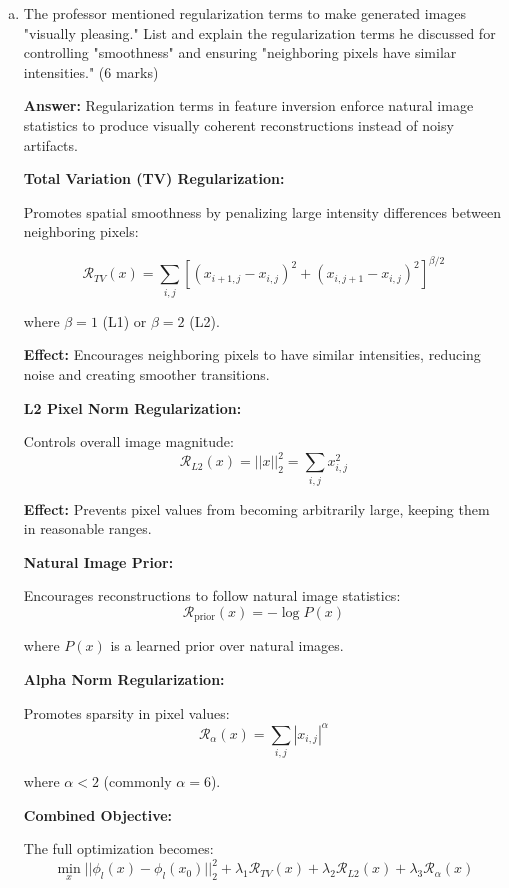 \documentclass[12pt]{article}
\newcommand{\answer}[1]{{\color{answercolor}\textbf{Answer:} #1}}
\newcommand{\explanation}[1]{{\color{explanationcolor}#1}}
\begin{document}
\begin{enumerate}[(a)]
    \item The professor mentioned regularization terms to make generated images "visually pleasing." List and explain the regularization terms he discussed for controlling "smoothness" and ensuring "neighboring pixels have similar intensities." \hfill (6 marks)
    
    \answer{Regularization terms in feature inversion enforce natural image statistics to produce visually coherent reconstructions instead of noisy artifacts.}
    
    \explanation{
    \textbf{Total Variation (TV) Regularization:}
    
    Promotes spatial smoothness by penalizing large intensity differences between neighboring pixels:
    
    $$\mathcal{R}_{TV}(x) = \sum_{i,j} \left[ (x_{i+1,j} - x_{i,j})^2 + (x_{i,j+1} - x_{i,j})^2 \right]^{\beta/2}$$
    
    where $\beta = 1$ (L1) or $\beta = 2$ (L2).
    
    \textbf{Effect:} Encourages neighboring pixels to have similar intensities, reducing noise and creating smoother transitions.
    
    \textbf{L2 Pixel Norm Regularization:}
    
    Controls overall image magnitude:
    $$\mathcal{R}_{L2}(x) = ||x||_2^2 = \sum_{i,j} x_{i,j}^2$$
    
    \textbf{Effect:} Prevents pixel values from becoming arbitrarily large, keeping them in reasonable ranges.
    
    \textbf{Natural Image Prior:}
    
    Encourages reconstructions to follow natural image statistics:
    $$\mathcal{R}_{\text{prior}}(x) = -\log P(x)$$
    
    where $P(x)$ is a learned prior over natural images.
    
    \textbf{Alpha Norm Regularization:}
    
    Promotes sparsity in pixel values:
    $$\mathcal{R}_{\alpha}(x) = \sum_{i,j} |x_{i,j}|^\alpha$$
    
    where $\alpha < 2$ (commonly $\alpha = 6$).
    
    \textbf{Combined Objective:}
    
    The full optimization becomes:
    $$\min_x ||\phi_l(x) - \phi_l(x_0)||_2^2 + \lambda_1 \mathcal{R}_{TV}(x) + \lambda_2 \mathcal{R}_{L2}(x) + \lambda_3 \mathcal{R}_{\alpha}(x)$$
    
}
\end{enumerate}
\end{document}
